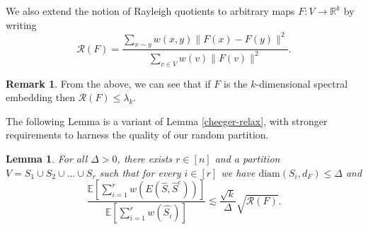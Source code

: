 \documentclass[a4paper,11pt]{article}
\newtheorem{lemma}[theorem]{Lemma}
\theoremstyle{definition}
\newtheorem{remark}[theorem]{Remark}
\newcommand{\R}{\mathbb{R}}
\newcommand{\rayleigh}[1]{\mathcal{R}\left(#1\right)}
\newcommand{\diam}[1]{\mathrm{diam}\left(#1\right)}
\newcommand{\E}[1]{\mathbb{E}\left[#1\right]}
\begin{document}
We also extend the notion of Rayleigh quotients to arbitrary maps $F: V \to \R^k$ by writing
\[
\rayleigh{F} = \frac{\sum\limits_{x \sim y} w(x, y)\|F(x) - F(y)\|^2}{\sum_{v \in V} w(v)\|F(v)\|^2}.
\]

\begin{remark}\label{rayleigh-F}
From the above, we can see that if $F$ is the $k$-dimensional spectral embedding then $\rayleigh{F} \le \lambda_k$.
\end{remark}

The following Lemma is a variant of Lemma \ref{cheeger-relax}, with stronger requirements to harness the quality of our random partition. 

\begin{lemma}\label{unmerged-nonexpanding}
For all $\Delta > 0$, there exists $r \in [n]$ and a partition $V = S_1 \cup S_2 \cup ... \cup S_r$ such that for every $i \in [r]$ we have $\diam{S_i, d_F} \le \Delta$ and
\begin{equation}\label{unmerged-nonexpanding-eqn}
\frac{\E{\displaystyle\sum_{i=1}^r w(E(\hat{S}, \hat{S}^c))}}{\E{\displaystyle\sum_{i=1}^r w(\hat{S_i})}} \lesssim \frac{\sqrt{k}}{\Delta}\sqrt{\rayleigh{F}}.
\end{equation}
\end{lemma}
\end{document}
